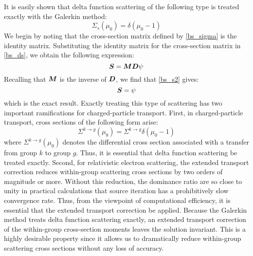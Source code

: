 It is easily shown that delta function scattering of the following type is
treated exactly with the Galerkin method:
\begin{equation}
\Sigma_s(\mu_0) = \delta(\mu_0-1)
\end{equation}
We begin by noting that the cross-section matrix defined by \cref{bs_sigma} 
is the identity matrix. Substituting the identity matrix for the cross-section 
matrix in \cref{bs_ds}, we obtain the following expression:
\begin{equation}
\bs{S} = \bs{MD}\psi
\label{bs_s2}
\end{equation}
Recalling that $\boldsymbol{M}$ is the inverse of $\boldsymbol{D}$, we find that \cref{bs_s2} gives:
\begin{equation}
\boldsymbol{S} = \psi
\end{equation}
which is the exact result. Exactly treating this type of scattering has two
important ramifications for charged-particle transport. First, in
charged-particle transport, cross sections of the following form arise:
\begin{equation}
\Sigma^{k\rightarrow g}(\mu_0) = \Sigma^{k\rightarrow g} \delta(\mu_0-1)
\end{equation}
where $\Sigma^{k\rightarrow g}(\mu_0)$ denotes the differential cross section
associated with a transfer from group $k$ to group $g$. Thus, it is essential
that delta function scattering be treated exactly. Second, for relativistic
electron scattering, the extended transport correction reduces within-group
scattering cross sections by two orders of magnitude or more. Without this
reduction, the dominance ratio are so close to unity in practical calculations
that source iteration has a prohibitively slow convergence rate. Thus, from
the viewpoint of computational efficiency, it is essential that the extended
transport correction be applied. Because the Galerkin method treats delta
function  scattering exactly, an extended transport correction of the
within-group cross-section moments leaves the solution
invariant\cite{morel_79}. This is a highly desirable property since it allows
us to dramatically reduce within-group scattering cross sections without any
loss of accuracy.

